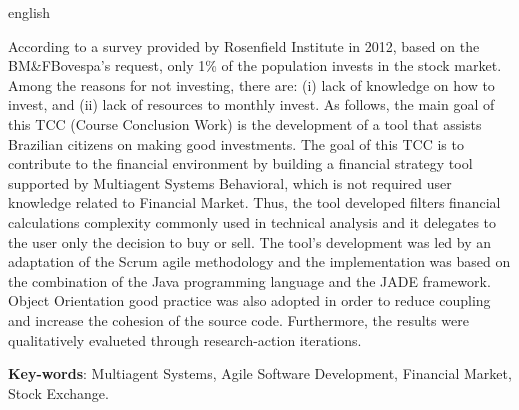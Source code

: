 \begin{resumo}[Abstract]
 \begin{otherlanguage*}{english}
   
   According to a survey provided by Rosenfield Institute in 2012, based on the  BM\&FBovespa's request, only 1\% of the population invests in the stock market. Among the reasons for not investing, there are: (i) lack of knowledge on how to invest, and (ii) lack of resources to monthly invest. As follows, the main goal of this TCC (Course Conclusion Work) is the development of a tool that assists Brazilian citizens on making good investments. The goal of this TCC is to contribute to the financial environment by building a financial strategy tool supported by Multiagent Systems Behavioral, which is not required user knowledge related to Financial Market. Thus, the tool developed filters  financial calculations complexity commonly used in technical analysis and it delegates to the user only the decision to buy or sell. The tool's development was led by an adaptation of the Scrum agile methodology and the implementation was based on the combination of the Java programming language and the JADE framework. Object Orientation good practice was also adopted in order to reduce coupling and increase the cohesion of the source code. Furthermore, the results were qualitatively evalueted through research-action iterations.


   \vspace{\onelineskip}
 
   \noindent 
   \textbf{Key-words}: Multiagent Systems, Agile Software Development, Financial Market, Stock Exchange.
 \end{otherlanguage*}
\end{resumo}
